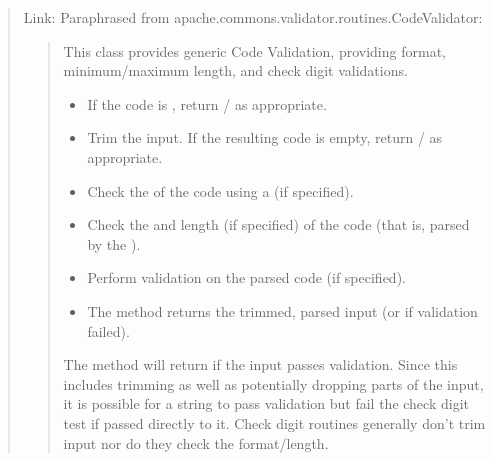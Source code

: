 \documentclass[letterpaper,10pt,english]{sphinxmanual}
\begin{document}
\begin{quote}

\sphinxAtStartPar
Link: 
Paraphrased from apache.commons.validator.routines.CodeValidator:
\begin{quote}

\sphinxAtStartPar
This class provides generic Code Validation, providing format, minimum/maximum length,
and check digit validations.
\begin{description}
\begin{itemize}
\item {} 
\sphinxAtStartPar
If the code is , return / as appropriate.

\item {} 
\sphinxAtStartPar
Trim the input. If the resulting code is empty, return / as appropriate.

\item {} 
\sphinxAtStartPar
Check the  of the code using a  (if specified).

\item {} 
\sphinxAtStartPar
Check the  and  length (if specified) of the  code
(that is, parsed by the ).

\item {} 
\sphinxAtStartPar
Perform  validation on the parsed code (if specified).

\item {} 
\sphinxAtStartPar
The  method returns the trimmed, parsed input (or  if validation failed).

\end{itemize}

\end{description}

\sphinxAtStartPar
{}
The  method will return  if the input passes validation.
Since this includes trimming as well as potentially dropping parts of the input,
it is possible for a string to pass validation but fail the check digit test
if passed directly to it. Check digit routines generally don’t trim input
nor do they check the format/length.


\end{quote}
\end{quote}
\end{document}
